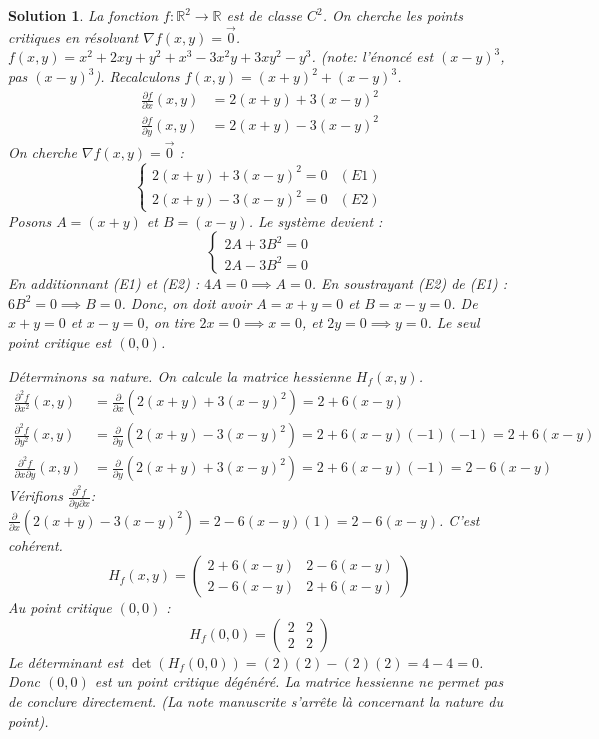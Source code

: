 \documentclass{article}
\newtheorem{solution}{Solution}
\begin{document}
\begin{solution}
La fonction $f: \mathbb{R}^2 \to \mathbb{R}$ est de classe $C^2$.
On cherche les points critiques en résolvant $\nabla f(x,y) = \vec{0}$.
$f(x,y) = x^2 + 2xy + y^2 + x^3 - 3x^2y + 3xy^2 - y^3$. (note: l'énoncé est $(x-y)^3$, pas $(x-y)^3$).
Recalculons $f(x,y) = (x+y)^2 + (x-y)^3$.
\begin{align*}
\frac{\partial f}{\partial x}(x,y) &= 2(x+y) + 3(x-y)^2 \\
\frac{\partial f}{\partial y}(x,y) &= 2(x+y) - 3(x-y)^2
\end{align*}
On cherche $\nabla f(x,y) = \vec{0}$ :
\[ \begin{cases} 2(x+y) + 3(x-y)^2 = 0 & (E1) \\ 2(x+y) - 3(x-y)^2 = 0 & (E2) \end{cases} \]
Posons $A = (x+y)$ et $B = (x-y)$. Le système devient :
\[ \begin{cases} 2A + 3B^2 = 0 \\ 2A - 3B^2 = 0 \end{cases} \]
En additionnant (E1) et (E2) : $4A = 0 \implies A = 0$.
En soustrayant (E2) de (E1) : $6B^2 = 0 \implies B = 0$.
Donc, on doit avoir $A = x+y = 0$ et $B = x-y = 0$.
De $x+y = 0$ et $x-y = 0$, on tire $2x = 0 \implies x = 0$, et $2y = 0 \implies y = 0$.
Le seul point critique est $(0,0)$.

Déterminons sa nature. On calcule la matrice hessienne $H_f(x,y)$.
\begin{align*}
\frac{\partial^2 f}{\partial x^2}(x,y) &= \frac{\partial}{\partial x} (2(x+y) + 3(x-y)^2) = 2 + 6(x-y) \\
\frac{\partial^2 f}{\partial y^2}(x,y) &= \frac{\partial}{\partial y} (2(x+y) - 3(x-y)^2) = 2 + 6(x-y)(-1)(-1) = 2 + 6(x-y) \\
\frac{\partial^2 f}{\partial x \partial y}(x,y) &= \frac{\partial}{\partial y} (2(x+y) + 3(x-y)^2) = 2 + 6(x-y)(-1) = 2 - 6(x-y)
\end{align*}
Vérifions $\frac{\partial^2 f}{\partial y \partial x}$:
$\frac{\partial}{\partial x} (2(x+y) - 3(x-y)^2) = 2 - 6(x-y)(1) = 2 - 6(x-y)$. C'est cohérent.
\[ H_f(x,y) = \begin{pmatrix} 2 + 6(x-y) & 2 - 6(x-y) \\ 2 - 6(x-y) & 2 + 6(x-y) \end{pmatrix} \]
Au point critique $(0,0)$ :
\[ H_f(0,0) = \begin{pmatrix} 2 & 2 \\ 2 & 2 \end{pmatrix} \]
Le déterminant est $\det(H_f(0,0)) = (2)(2) - (2)(2) = 4 - 4 = 0$.
Donc $(0,0)$ est un point critique dégénéré. La matrice hessienne ne permet pas de conclure directement.
(La note manuscrite s'arrête là concernant la nature du point).

\end{solution}
\end{document}
